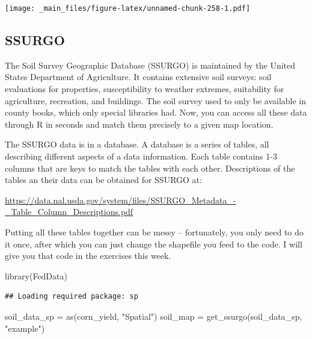 \documentclass[
]{book}
\newenvironment{Shaded}{\begin{snugshade}}{\end{snugshade}}
\newcommand{\CommentTok}[1]{\textcolor[rgb]{0.56,0.35,0.01}{\textit{#1}}}
\newcommand{\FunctionTok}[1]{\textcolor[rgb]{0.00,0.00,0.00}{#1}}
\newcommand{\NormalTok}[1]{#1}
\newcommand{\OtherTok}[1]{\textcolor[rgb]{0.56,0.35,0.01}{#1}}
\newcommand{\StringTok}[1]{\textcolor[rgb]{0.31,0.60,0.02}{#1}}
\begin{document}
\texttt{[image: \_main\_files/figure-latex/unnamed-chunk-258-1.pdf]}

\begin{Shaded}
\end{Shaded}

\hypertarget{ssurgo}{%
\subsection{SSURGO}\label{ssurgo}}

The Soil Survey Geographic Database (SSURGO) is maintained by the United States Department of Agriculture. It contains extensive soil surveys: soil evaluations for properties, susceptibility to weather extremes, suitability for agriculture, recreation, and buildings. The soil survey used to only be available in county books, which only special libraries had. Now, you can access all these data through R in seconds and match them precisely to a given map location.

The SSURGO data is in a database. A database is a series of tables, all describing different aspects of a data information. Each table contains 1-3 columns that are keys to match the tables with each other. Descriptions of the tables an their data can be obtained for SSURGO at:

\url{https://data.nal.usda.gov/system/files/SSURGO_Metadata_-_Table_Column_Descriptions.pdf}

Putting all these tables together can be messy -- fortunately, you only need to do it once, after which you can just change the shapefile you feed to the code. I will give you that code in the exercises this week.

\begin{Shaded}
\begin{Highlighting}[]
\FunctionTok{library}\NormalTok{(FedData)}
\end{Highlighting}
\end{Shaded}

\begin{verbatim}
## Loading required package: sp
\end{verbatim}

\begin{Shaded}
\begin{Highlighting}[]
\NormalTok{soil\_data\_sp }\OtherTok{=} \FunctionTok{as}\NormalTok{(corn\_yield, }\StringTok{"Spatial"}\NormalTok{)}
\NormalTok{soil\_map }\OtherTok{=} \FunctionTok{get\_ssurgo}\NormalTok{(soil\_data\_sp, }\StringTok{"example"}\NormalTok{)}
\end{Highlighting}
\end{Shaded}
\end{document}
